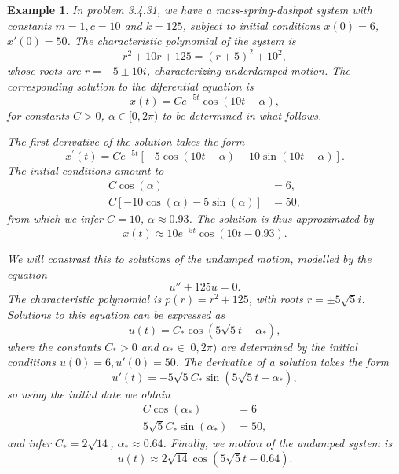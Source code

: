 \documentclass[11pt]{amsart}
\newtheorem{example}{Example}
\numberwithin{equation}{section}
\begin{document}
\begin{example}
In problem 3.4.31, we have a mass-spring-dashpot system with constants $m=1, c=10$ and $k=125$, subject to initial conditions $x(0)=6$, $x'(0)=50$. The characteristic polynomial of the system is 
\begin{equation*}
r^2+10r+125 = (r+5)^2+10^2,
\end{equation*}
whose roots are $r=-5 \pm 10i$, characterizing underdamped motion. The corresponding solution to the diferential equation is 
\begin{equation*}
x(t)=Ce^{-5t}\cos(10t-\alpha),
\end{equation*}
for constants $C>0$, $\alpha \in [0,2\pi)$ to be determined in what follows.
 
The first derivative of the solution takes the form
\begin{equation*}
x^{'}(t)  = Ce^{-5t}[-5\cos(10t-\alpha)-10\sin(10t-\alpha)].
\end{equation*}
The initial conditions amount to
\begin{align*}
C\cos(\alpha) & =6, \\
C[-10\cos(\alpha)-5\sin(\alpha)] & = 50,
\end{align*}
from which we infer $C=10$, $\alpha\approx 0.93$. The solution is thus approximated by
\begin{equation*}
x(t)\approx 10e^{-5t}\cos(10t-0.93).
\end{equation*}

We will constrast this to solutions of the undamped motion, modelled by the equation
\begin{equation*}
u''+125u=0.
\end{equation*}
The characteristic polynomial is $p(r)=r^2+125$, with roots $r=\pm5\sqrt{5}i$. Solutions to this equation can be expressed as
\begin{equation*}
u(t)=C_{*}\cos(5\sqrt{5}t-\alpha_{*}),
\end{equation*}
where the constants $C_{*}>0$ and $\alpha_{*} \in [0, 2\pi)$ are determined by the initial conditions $u(0)=6, u'(0)=50$. The derivative of a solution takes the form 
\begin{equation*}
u'(t)=-5\sqrt{5}C_{*}\sin(5\sqrt{5}t-\alpha_{*}), 
\end{equation*}
so using the initial date we obtain 
\begin{align*}
C\cos(\alpha_{*}) & =6  \\
5\sqrt{5}C_{*}\sin(\alpha_{*}) & = 50,
\end{align*}
and infer $C_{*} = 2\sqrt{14}$, $\alpha_{*} \approx 0.64$. Finally, we motion of the undamped system is 
\begin{equation*}
u(t)  \approx 2\sqrt{14}\cos(5\sqrt{5}t-0.64).
\end{equation*}


\end{example}
\end{document}
